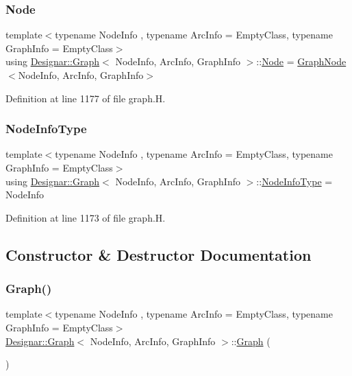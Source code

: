 \subsubsection{\texorpdfstring{Node}{Node}}
{\footnotesize\ttfamily template$<$typename Node\+Info , typename Arc\+Info  = Empty\+Class, typename Graph\+Info  = Empty\+Class$>$ \\
using \hyperlink{class_designar_1_1_graph}{Designar\+::\+Graph}$<$ Node\+Info, Arc\+Info, Graph\+Info $>$\+::\hyperlink{class_designar_1_1_graph_a5dfc7dba9d092ac489c72e40390c37d0}{Node} =  \hyperlink{class_designar_1_1_graph_node}{Graph\+Node}$<$Node\+Info, Arc\+Info, Graph\+Info$>$}



Definition at line 1177 of file graph.\+H.

\mbox{\label{class_designar_1_1_graph_a31ac58ee9562d1695e63449318577032}} 
\subsubsection{\texorpdfstring{Node\+Info\+Type}{NodeInfoType}}
{\footnotesize\ttfamily template$<$typename Node\+Info , typename Arc\+Info  = Empty\+Class, typename Graph\+Info  = Empty\+Class$>$ \\
using \hyperlink{class_designar_1_1_graph}{Designar\+::\+Graph}$<$ Node\+Info, Arc\+Info, Graph\+Info $>$\+::\hyperlink{class_designar_1_1_graph_a31ac58ee9562d1695e63449318577032}{Node\+Info\+Type} =  Node\+Info}



Definition at line 1173 of file graph.\+H.



\subsection{Constructor \& Destructor Documentation}
\mbox{\label{class_designar_1_1_graph_a606f7514b8036679207da8a09ddfa6bd}} 
\subsubsection{\texorpdfstring{Graph()}{Graph()}\hspace{0.1cm}{\footnotesize\ttfamily [1/5]}}
{\footnotesize\ttfamily template$<$typename Node\+Info , typename Arc\+Info  = Empty\+Class, typename Graph\+Info  = Empty\+Class$>$ \\
\hyperlink{class_designar_1_1_graph}{Designar\+::\+Graph}$<$ Node\+Info, Arc\+Info, Graph\+Info $>$\+::\hyperlink{class_designar_1_1_graph}{Graph} (\begin{DoxyParamCaption}{ }\end{DoxyParamCaption})\hspace{0.3cm}{\ttfamily [inline]}}



